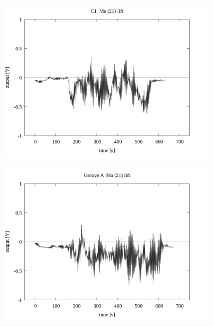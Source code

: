 \documentclass[a4paper]{jsarticle}
\begin{document}
\begin{figure}[htbp]
    \footnotesize
    \begin{center}
        \includegraphics[width=140mm]{../../../33_result/210806/moving_average/21/lift/C1_ma(21)_lift.png}
    \end{center}
\end{figure}

\begin{figure}[htbp]
    \footnotesize
    \begin{center}
        \includegraphics[width=140mm]{../../../33_result/210806/moving_average/21/lift/Groove_A_ma(21)_lift.png}
    \end{center}
\end{figure}
\end{document}
